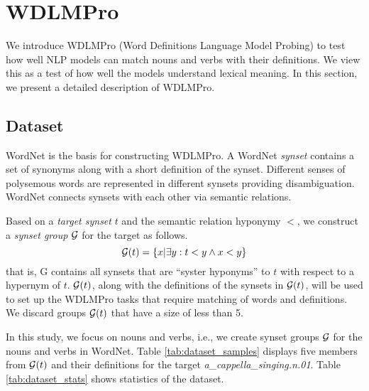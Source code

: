 \documentclass[11pt,a4paper]{article}
\begin{document}
\section{WDLMPro}
We introduce  WDLMPro (Word Definitions Language Model
Probing) to test how well NLP models can match
nouns and verbs with  their
definitions.
We view this as a test of how well the models understand lexical meaning.
In this section, we
present a detailed description of WDLMPro.

\subsection{Dataset}
WordNet \cite{miller95wordnet} is the basis for
constructing WDLMPro.  A WordNet \textit{synset} contains a
set of synonyms along with a short definition of
the synset.  Different senses of polysemous words are
represented in different synsets providing
disambiguation. WordNet connects synsets with each other via
semantic relations.

Based on a \emph{target synset}
$t$ and the semantic relation hyponymy $<$, we construct
a \emph{synset group} $\cal G$ for the target as follows.
\[
  {\cal G}(t) = \{ x | \exists y: t<y \wedge x<y \}
  \]
that is, {\cal G} contains all synsets that are ``syster
hyponyms'' to $t$ with respect to a hypernym of $t$.
${\cal G}(t)$, along with the definitions of the synsets in
${\cal G}(t)$,
will be used to
set up the WDLMPro tasks that require matching of words and definitions.
We discard groups ${\cal G}(t)$ that
have a size of less than 5.


In this study, we focus on nouns and verbs, i.e., we create
synset groups ${\cal G}$ for the nouns and verbs in WordNet.
Table
\ref{tab:dataset_samples} displays five members from ${\cal
  G} (t)$ 
and their definitions
for the target
\emph{a\_cappella\_singing.n.01}. 
Table \ref{tab:dataset_stats} shows statistics of the dataset.


  
\end{document}
